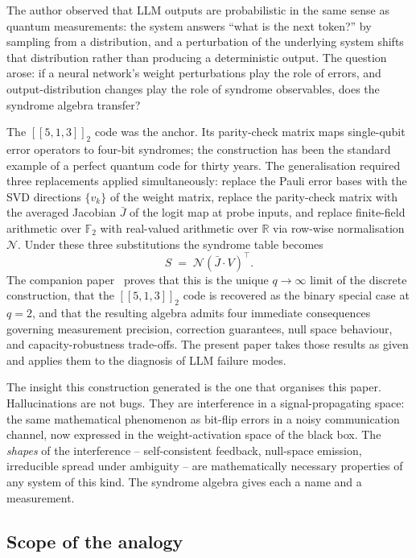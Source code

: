 \documentclass[11pt,a4paper]{article}
\newcommand{\Ccode}[3]{[\![#1,#2,#3]\!]}
\newcommand{\Jbar}{\bar{J}}
\newcommand{\Norm}{\mathcal{N}}
\begin{document}
The author observed that LLM outputs are probabilistic in the same sense as quantum measurements: the system answers ``what is the next token?'' by sampling from a distribution, and a perturbation of the underlying system shifts that distribution rather than producing a deterministic output. The question arose: if a neural network's weight perturbations play the role of errors, and output-distribution changes play the role of syndrome observables, does the syndrome algebra transfer?

The $\Ccode{5}{1}{3}_2$ code was the anchor. Its parity-check matrix maps single-qubit error operators to four-bit syndromes; the construction has been the standard example of a perfect quantum code for thirty years. The generalisation required three replacements applied simultaneously: replace the Pauli error bases with the SVD directions $\{v_k\}$ of the weight matrix, replace the parity-check matrix with the averaged Jacobian $\Jbar$ of the logit map at probe inputs, and replace finite-field arithmetic over $\mathbb{F}_2$ with real-valued arithmetic over $\mathbb{R}$ via row-wise normalisation $\Norm$. Under these three substitutions the syndrome table becomes
\[
   S \;=\; \Norm(\Jbar \cdot V)^\top.
\]
The companion paper~\cite{SyndromeAlgebra} proves that this is the unique $q \to \infty$ limit of the discrete construction, that the $\Ccode{5}{1}{3}_2$ code is recovered as the binary special case at $q = 2$, and that the resulting algebra admits four immediate consequences governing measurement precision, correction guarantees, null space behaviour, and capacity-robustness trade-offs. The present paper takes those results as given and applies them to the diagnosis of LLM failure modes.

The insight this construction generated is the one that organises this paper. Hallucinations are not bugs. They are interference in a signal-propagating space: the same mathematical phenomenon as bit-flip errors in a noisy communication channel, now expressed in the weight-activation space of the black box. The \emph{shapes} of the interference -- self-consistent feedback, null-space emission, irreducible spread under ambiguity -- are mathematically necessary properties of any system of this kind. The syndrome algebra gives each a name and a measurement.


\subsection{Scope of the analogy}
\label{sec:mot-scope}
\end{document}
